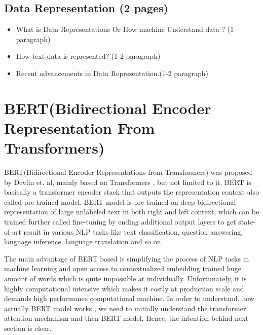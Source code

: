 \documentclass[%
	BCOR=8mm, %
	DIV=12, 
	toc=bibliography, %
	toc=listof, %
	oneside, %
	egregdoesnotlikesansseriftitles, %
	]{scrbook}
\begin{document}
\subsection{Data Representation (2 pages)}
\begin{itemize}
\item What is Data Representations Or How machine Understand data ? (1 paragraph)
\item How text data is represented? (1-2 paragraph)
\item Recent advancements in Data Representation.(1-2 paragraph)
\end{itemize}
\section{BERT(Bidirectional Encoder Representation From Transformers)}

 BERT(Bidirectional Encoder Representations from Transformers) was proposed by Devlin et$.$ al\cite{devlin_bert_2019}, mainly based on Transformers \cite{vaswani_attention_2017},
 but not limited to it. BERT is  basically a transformer encoder stack that outputs the representation context also called pre-trained model. BERT model is pre-trained on deep bidirectional 
 representation of large unlabeled text in both right and left context, which can be trained further called fine-tuning by ending additional output layers to get state-of-art result in various 
 NLP tasks like text classification, question answering, language inference,  language translation and so on. 
 
 The main advantage of BERT based is simplifying the process of NLP tasks in machine learning and open access to contextualized embedding trained huge amount of words which is 
 quite impossible at individually. Unfortunately, it is highly computational intensive which makes it costly at production scale and demands high performance computational machine.
In order to understand, how actually BERT model works , we need to initially understand the transformer attention mechanism and then BERT model. Hence, the intention behind next 
section is clear.
\end{document}
